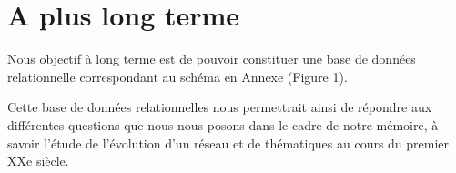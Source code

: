 \section{A plus long terme}
Nous objectif à long terme est de pouvoir constituer une base de données relationnelle correspondant au schéma en Annexe (Figure 1).

Cette base de données relationnelles nous permettrait ainsi de répondre aux différentes questions que nous nous posons dans le cadre de notre mémoire, à savoir l'étude de l'évolution d'un réseau et de thématiques au cours du premier XXe siècle. 